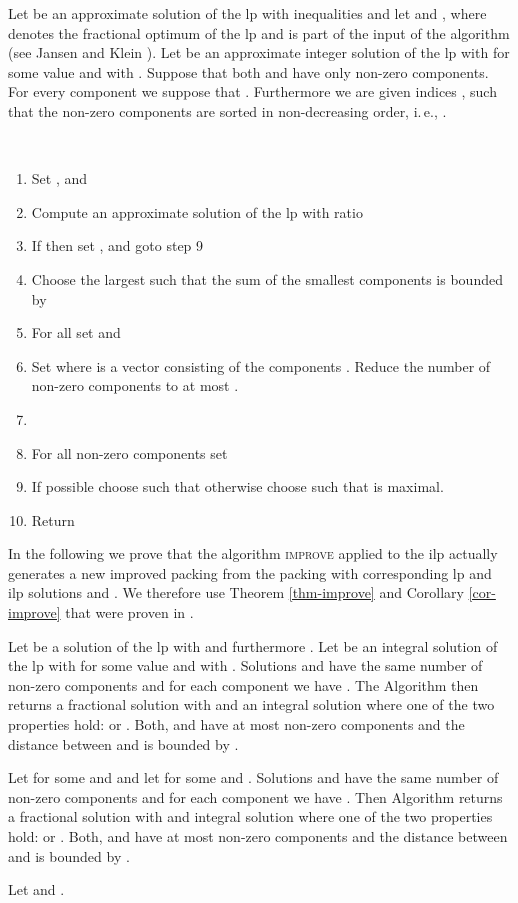 Let  be an approximate solution of the \ac{lp}  with  inequalities and let  and , where  denotes the fractional optimum of the \ac{lp} and  is part of the input of the algorithm (see Jansen and Klein \cite{jansen2013binpacking}). 
Let  be an approximate integer solution of the \ac{lp} with  for some value 
 and with . 
Suppose that both  and  have only  non-zero components. For every component  we suppose that . Furthermore we are given indices , such that the non-zero components  are sorted in non-decreasing order, i.\,e., .
\begin{algo}\label{improve}
\ 
  \begin{enumerate}
   \item Set ,  and 
   
    \item Compute an approximate solution  of the \ac{lp} 
	with ratio 
	\item If  then set , 
	 and goto step 9
  \item Choose the largest  such that the sum of the smallest components  is bounded by
  
	\item For all  set  
	and 
	\item Set  where  is a
          vector consisting of the components 
	. Reduce the number of non-zero components to at most .
  \item 
  \item For all non-zero components  set 
	\item If possible choose  such that  otherwise
  choose  such that  is maximal.
  \item Return 
  \end{enumerate}
\end{algo}


In the following we prove that the algorithm \textsc{improve} applied to the \BP \ac{ilp} actually generates a new improved packing  from the packing  with corresponding \ac{lp} and \ac{ilp} solutions  and . We therefore use Theorem \ref{thm-improve} and Corollary \ref{cor-improve} that were proven in \cite{jansen2013binpacking}.

\begin{theorem}\label{thm-improve}
    Let  be a solution of the \ac{lp} with  and furthermore . Let  be an integral
	 solution of the \ac{lp} with   for some value 
	 and with .
	 Solutions  and  have the same number of non-zero components and for each component we have 
	 .
	The Algorithm  then returns a fractional solution  with  and an integral solution
	 where one of the two properties hold:
	  or . 
	 Both,  and  have at most 
	non-zero components and the distance between  and  is bounded by .
\end{theorem}
\begin{corollary}\label{cor-improve}
    Let  for some  and 
	and let  for some  and . 
	Solutions  and  have the same number of non-zero components and for each component we have 
	 .
	 Then Algorithm  returns a fractional solution
	 with  and integral solution  where one of the two properties hold:
	  or . 
	Both,  and  have at most 
	non-zero components and the distance between  and  is bounded by .
\end{corollary}
Let  and .

